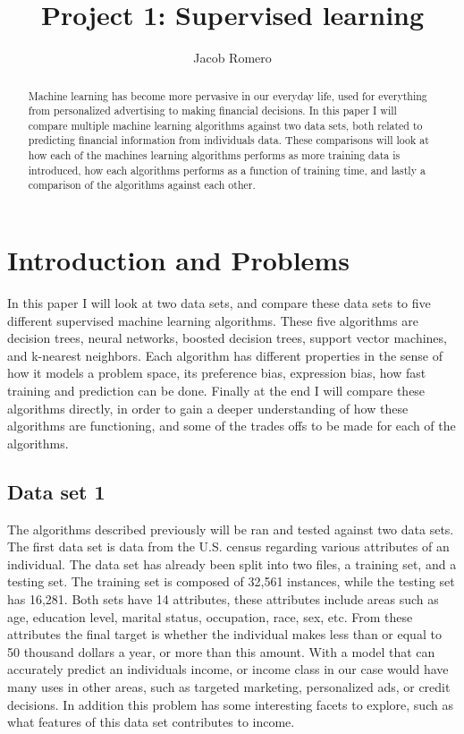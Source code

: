 \documentclass[
	letterpaper, %
]{IEEEtran}
\author{Jacob Romero}
\title{Project 1: Supervised learning}
\begin{document}
	\maketitle
	
	\begin{abstract}
		Machine learning has become more pervasive in our everyday life, used for everything from personalized advertising to making financial decisions. In this paper I will compare multiple machine learning algorithms against two data sets, both related to predicting financial information from individuals data. These comparisons will look at how each of the machines learning algorithms performs as more training data is introduced, how each algorithms performs as a function of training time, and lastly a comparison of the algorithms against each other.
	\end{abstract}
	
	\section{Introduction and Problems}
	In this paper I will look at two data sets, and compare these data sets to five different supervised machine learning algorithms. These five algorithms are decision trees, neural networks, boosted decision trees, support vector machines, and k-nearest neighbors. Each algorithm has different properties in the sense of how it models a problem space, its preference bias, expression bias, how fast training and prediction can be done. Finally at the end I will compare these algorithms directly, in order to gain a deeper understanding of how these algorithms are functioning, and some of the trades offs to be made for each of the algorithms.
	
	\subsection{Data set 1}
	The algorithms described previously will be ran and tested against two data sets. The first data set is data from the U.S. census regarding various attributes of an individual. The data set has already been split into two files, a training set, and a testing set. The training set is composed of 32,561 instances, while the testing set has 16,281. Both sets have 14 attributes, these attributes include areas such as age, education level, marital status, occupation, race, sex, etc. From these attributes the final target is whether the individual makes less than or equal to 50 thousand dollars a year, or more than this amount. With a model that can accurately predict an individuals income, or income class in our case would have many uses in other areas, such as targeted marketing, personalized ads, or credit decisions. In addition this problem has some interesting facets to explore, such as what features of this data set contributes to income.
	
\end{document}
